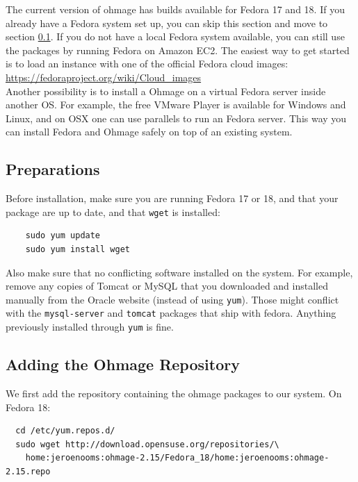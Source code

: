 \documentclass{scrartcl}
\begin{document}
The current version of ohmage has builds available for Fedora 17 and 18.
If you already have a Fedora system set up, you can skip this section and
move to section \ref{preparations}.
If you do not have a local Fedora system available, you can still use
the packages by running Fedora on Amazon EC2. The easiest way to get started is
to load an instance with one of the official Fedora cloud images: \\

\url{https://fedoraproject.org/wiki/Cloud_images} \\

\noindent Another possibility is to install a Ohmage on a virtual Fedora server
inside another OS. For example, the free VMware Player is available for Windows 
and Linux, and on OSX one can use parallels to run an Fedora server. This way
you can install Fedora and Ohmage safely on top of an existing system.

\subsection{Preparations}
\label{preparations}

Before installation, make sure you are running Fedora 17 or 18, and that your
package are up to date, and that \texttt{wget} is installed:

\begin{verbatim}
    sudo yum update
    sudo yum install wget
\end{verbatim}

\noindent Also make sure that no conflicting software installed on the system.
For example, remove any copies of Tomcat or MySQL that you downloaded and
installed manually from the Oracle website (instead of using \texttt{yum}).
Those might conflict with the \texttt{mysql-server} and \texttt{tomcat}
packages that ship with fedora. Anything previously installed through
\texttt{yum} is fine.

\subsection{Adding the Ohmage Repository}

We first add the repository containing the ohmage packages to our system. On
Fedora 18:

\begin{verbatim}
  cd /etc/yum.repos.d/
  sudo wget http://download.opensuse.org/repositories/\
    home:jeroenooms:ohmage-2.15/Fedora_18/home:jeroenooms:ohmage-2.15.repo
\end{verbatim}
\end{document}
